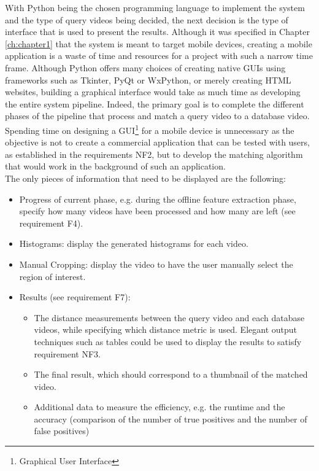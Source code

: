 With Python being the chosen programming language to implement the system and the type of query videos being decided, the next decision is the type of interface that is used to present the results. Although it was specified in Chapter \ref{ch:chapter1} that the system is meant to target mobile devices, creating a mobile application is a waste of time and resources for a project with such a narrow time frame. Although Python offers many choices of creating native GUIs using frameworks such as Tkinter, PyQt or WxPython, or merely creating HTML websites, building a graphical interface would take as much time as developing the entire system pipeline. Indeed, the primary goal is to complete the different phases of the pipeline that process and match a query video to a database video. Spending time on designing a GUI\footnote{Graphical User Interface} for a mobile device is unnecessary as the objective is not to create a commercial application that can be tested with users, as established in the requirements NF2, but to develop the matching algorithm that would work in the background of such an application.\\

The only pieces of information that need to be displayed are the following:
\begin{itemize}
    \item Progress of current phase, e.g. during the offline feature extraction phase, specify how many videos have been processed and how many are left (see requirement F4).
    \item Histograms: display the generated histograms for each video.
    \item Manual Cropping: display the video to have the user manually select the region of interest.
    \item Results (see requirement F7):
    \begin{itemize}
        \item The distance measurements between the query video and each database videos, while specifying which distance metric is used. Elegant output techniques such as tables could be used to display the results to satisfy requirement NF3.
        \item The final result, which should correspond to a thumbnail of the matched video.
        \item Additional data to measure the efficiency, e.g. the runtime and the accuracy (comparison of the number of true positives and the number of false positives)
    \end{itemize}
\end{itemize}

